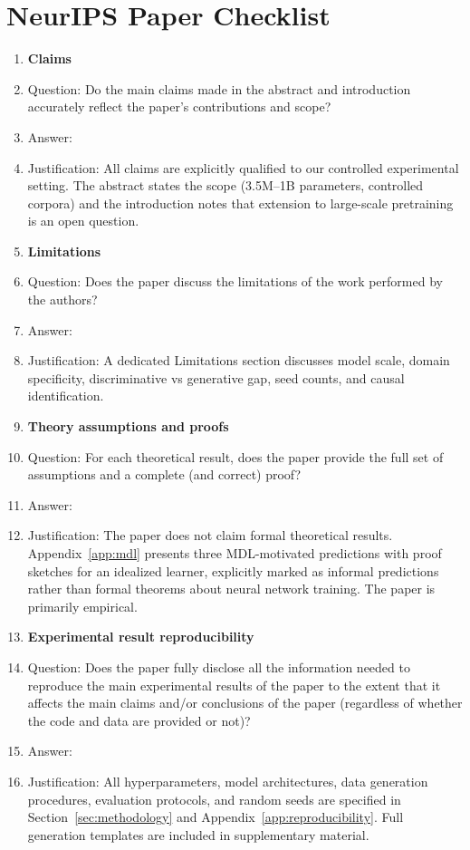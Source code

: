 \documentclass{article}
\begin{document}
\section*{NeurIPS Paper Checklist}

\begin{enumerate}

\item {\bf Claims}
    \item[] Question: Do the main claims made in the abstract and introduction accurately reflect the paper's contributions and scope?
    \item[] Answer: \answerYes{}
    \item[] Justification: All claims are explicitly qualified to our controlled experimental setting. The abstract states the scope (3.5M--1B parameters, controlled corpora) and the introduction notes that extension to large-scale pretraining is an open question.

\item {\bf Limitations}
    \item[] Question: Does the paper discuss the limitations of the work performed by the authors?
    \item[] Answer: \answerYes{}
    \item[] Justification: A dedicated Limitations section discusses model scale, domain specificity, discriminative vs generative gap, seed counts, and causal identification.

\item {\bf Theory assumptions and proofs}
    \item[] Question: For each theoretical result, does the paper provide the full set of assumptions and a complete (and correct) proof?
    \item[] Answer: \answerNA{}
    \item[] Justification: The paper does not claim formal theoretical results. Appendix~\ref{app:mdl} presents three MDL-motivated predictions with proof sketches for an idealized learner, explicitly marked as informal predictions rather than formal theorems about neural network training. The paper is primarily empirical.

\item {\bf Experimental result reproducibility}
    \item[] Question: Does the paper fully disclose all the information needed to reproduce the main experimental results of the paper to the extent that it affects the main claims and/or conclusions of the paper (regardless of whether the code and data are provided or not)?
    \item[] Answer: \answerYes{}
    \item[] Justification: All hyperparameters, model architectures, data generation procedures, evaluation protocols, and random seeds are specified in Section~\ref{sec:methodology} and Appendix~\ref{app:reproducibility}. Full generation templates are included in supplementary material.


\end{enumerate}
\end{document}
